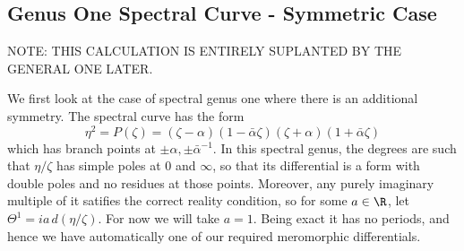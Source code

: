 \subsection{Genus One Spectral Curve - Symmetric Case}

NOTE: THIS CALCULATION IS ENTIRELY SUPLANTED BY THE GENERAL ONE LATER. 

We first look at the case of spectral genus one where there is an additional symmetry. The spectral curve has the form
\[
η ^2 = P( ζ  ) = ( ζ  - α  )(1-\bar{α}   ζ  )( ζ  + α  )(1+\bar{α}   ζ  )
\]
which has branch points at $\pm α  , \pm\bar{α}  ^{-1}$. In this spectral genus, the degrees are such that $ η  / ζ  $ has simple poles at $0$ and $\infty$, so that its differential is a form with double poles and no residues at those points. Moreover, any purely imaginary multiple of it satifies the correct reality condition, so for some $a\in\R$, let $Θ^1 = ia\,d( η  / ζ  )$. For now we will take $a=1$. Being exact it has no periods, and hence we have automatically one of our required meromorphic differentials.

